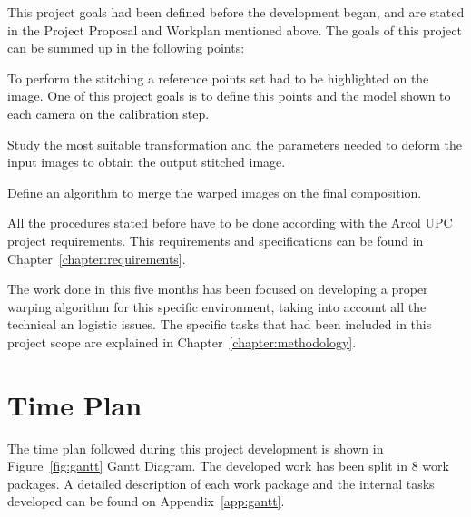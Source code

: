 This project goals had been defined before the development began, and are stated in the Project Proposal and Workplan mentioned above. The goals of this project can be summed up in the following points:
\vspace{-0.5em}
\begin{description}[font=\normalfont\textsl]
\item [Representative points automatic detection.] To perform the stitching a reference points set had to be highlighted on the image. One of this project goals is to define this points and the model shown to each camera on the calibration step.
\item [Estimate the warping parameters. ] Study the most suitable transformation and the parameters needed to deform the input images to obtain the output stitched image.
\item [Blending the results on the final stitching. ] Define an algorithm to merge the warped images on the final composition.
\item [Follow the requirements stated by the Arcol project. ]All the procedures stated before have to be done according with the Arcol UPC project requirements. This requirements and specifications can be found in Chapter~\ref{chapter:requirements}. 
\end{description}

The work done in this five months has been focused on developing a proper warping algorithm for this specific environment, taking into account all the technical an logistic issues. The specific tasks that had been included in  this project scope are explained in Chapter~\ref{chapter:methodology}.

\section{Time Plan}
The time plan followed during this project development is shown in Figure~\ref{fig:gantt} Gantt Diagram. The developed work has been split in 8 work packages. A detailed description of each work package and the internal tasks developed can be found on Appendix~\ref{app:gantt}. 

